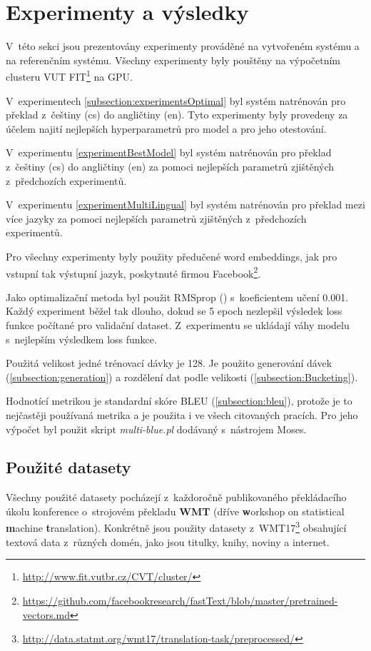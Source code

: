 \chapter{Experimenty a výsledky} \label{chapter:results}
V~této sekci jsou prezentovány experimenty prováděné na vytvořeném systému a na referenčním systému. Všechny experimenty byly pouštěny na výpočetním clusteru VUT FIT\footnote{\url{http://www.fit.vutbr.cz/CVT/cluster/}} na GPU.

V~experimentech \ref{subsection:experimentsOptimal} byl systém natrénován pro překlad z~češtiny (cs) do angličtiny (en). Tyto experimenty byly provedeny za účelem najití nejlepších hyperparametrů pro model a pro jeho otestování.

V~experimentu \ref{experimentBestModel} byl systém natrénován pro překlad z~češtiny (cs) do angličtiny (en) za pomoci nejlepších parametrů zjištěných z~předchozích experimentů.

V~experimentu \ref{experimentMultiLingual} byl systém natrénován pro překlad mezi více jazyky za pomoci nejlepších parametrů zjištěných z~předchozích experimentů.

Pro všechny experimenty byly použity předučené word embeddings, jak pro vstupní tak výstupní jazyk, poskytnuté firmou Facebook\footnote{\url{https://github.com/facebookresearch/fastText/blob/master/pretrained-vectors.md}}.

Jako optimalizační metoda byl použit RMSprop (\cite{gradientDescent}) s~koeficientem učení 0.001. Každý experiment běžel tak dlouho, dokud se 5 epoch nezlepšil výsledek loss funkce počítané pro validační dataset. Z~experimentu se ukládají váhy modelu s~nejlepším výsledkem loss funkce.

Použitá velikost jedné trénovací dávky je 128. Je použito generování dávek (\ref{subsection:generation}) a rozdělení dat podle velikosti (\ref{subsection:Bucketing}).

Hodnotící metrikou je standardní skóre BLEU (\ref{subsection:bleu}), protože je to nejčastěji používaná metrika a je použita i ve všech citovaných pracích. Pro jeho výpočet byl použit skript \emph{multi-blue.pl} dodávaný s~nástrojem Moses.


\section{Použité datasety}
Všechny použité datasety pocházejí z~každoročně publikovaného překládacího úkolu konference o~strojovém překladu \textbf{WMT} (dříve \textbf{w}orkshop on statistical \textbf{m}achine \textbf{t}ranslation). Konkrétně jsou použity datasety z~WMT17\footnote{\url{http://data.statmt.org/wmt17/translation-task/preprocessed/}} obsahující textová data z~různých domén, jako jsou titulky, knihy, noviny a internet.


